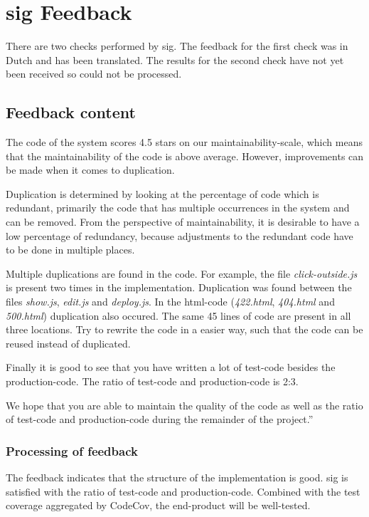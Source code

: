 \chapter{\texorpdfstring{\Gls{sig}}{SIG} Feedback}
There are two checks performed by \gls{sig}. The feedback for the first check was in Dutch and has been translated. The results for the second check have not yet been received so could not be processed.

\section{Feedback content}
The code of the system scores 4.5 stars on our maintainability-scale, which means that the maintainability of the code is above average. However, improvements can be made when it comes to duplication.

Duplication is determined by looking at the percentage of code which is redundant, primarily the code that has multiple occurrences in the system and can be removed. From the perspective of maintainability, it is desirable to have a low percentage of redundancy, because adjustments to the redundant code have to be done in multiple places.

Multiple duplications are found in the code. For example, the file \textit{click-outside.js} is present two times in the implementation. Duplication was found between the files \textit{show.js}, \textit{edit.js} and \textit{deploy.js}. In the html-code (\textit{422.html}, \textit{404.html} and \textit{500.html}) duplication also occured. The same 45 lines of code are present in all three locations. Try to rewrite the code in a easier way, such that the code can be reused instead of duplicated.

Finally it is good to see that you have written a lot of test-code besides the production-code. The ratio of test-code and production-code is 2:3.

We hope that you are able to maintain the quality of the code as well as the ratio of test-code and production-code during the remainder of the project.''

\subsection{Processing of feedback}
The feedback indicates that the structure of the implementation is good. \Gls{sig} is satisfied with the ratio of test-code and production-code. Combined with the test coverage aggregated by CodeCov, the end-product will be well-tested.


